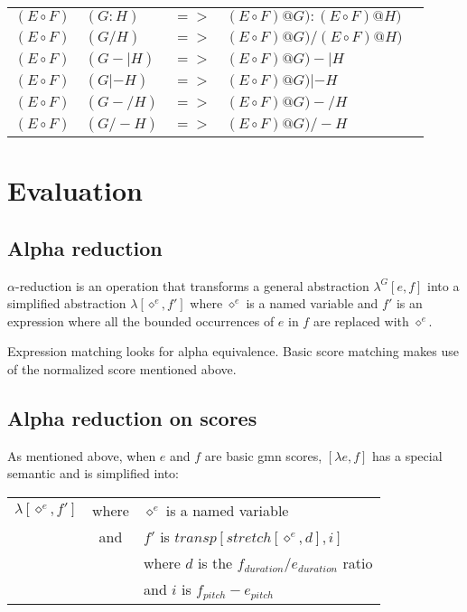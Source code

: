 \documentclass[10pt,a4paper,frenchb]{article}
\newcommand{\var}[1]{\diamond^#1}
\newcommand{\seq}			{:}
\begin{document}
\begin{table}[H]
\begin{center}
\begin{tabular}{r@{@}lcll}
 \hline
 $ (E \circ F)$ & $(G \seq H)$ & $=>$ & $(E \circ F) @ G) \seq (E \circ F) @ H)$ & \\
 $ (E \circ F)$ & $(G / H)$ & $=>$ & $(E \circ F) @ G) / (E \circ F) @ H)$ & \\ 
 $ (E \circ F)$ & $(G -| H)$ & $=>$ & $(E \circ F) @ G) -| H$ & \\
 $ (E \circ F)$ & $(G |- H)$ & $=>$ & $(E \circ F) @ G) |- H$ & \\ 
 $ (E \circ F)$ & $(G -/ H)$ & $=>$ & $(E \circ F) @ G) -/ H$ & \\
 $ (E \circ F)$ & $(G /- H)$ & $=>$ & $(E \circ F) @ G) /- H$ & 
\\

\end{tabular}
\end{center}
\end{table}


\section{Evaluation}

\subsection{Alpha reduction}

$\alpha$-reduction is an operation that transforms a general abstraction $\lambda^G[e,f]$ into a simplified abstraction $\lambda[\var{e},f']$ where $\var{e}$ is a named variable and $f'$ is an expression where all the bounded occurrences of $e$ in $f$ are replaced with $\var{e}$.

Expression matching looks for alpha equivalence. Basic score matching makes use of the normalized score mentioned above. 

\subsection{Alpha reduction on scores}

As mentioned above, when $e$ and $f$ are basic gmn scores, $[\lambda e,f]$ has a special semantic and is simplified into: 
\begin{tabular}{rcl}
 $\lambda[\var{e},f']$ & where & $\var{e}$ is a named variable \\
 	& and & $f'$ is $transp[stretch[\var{e}, d], i]$ \\
 	&  & where $d$ is the $f_{duration} / e_{duration}$ ratio \\
 	&  & and $i$ is $f_{pitch} - e_{pitch}$ \\
\end{tabular}
\end{document}
